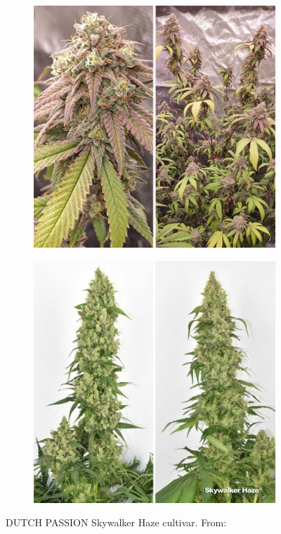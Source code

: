 \begin{figure}[htbp]
    \begin{subfigure}[t]{.48\textwidth}
        \includegraphics[width=\linewidth]{DUTCH-PASSION_Skywalker-Haze_1}
        \label{fig:cannabis_skywalker-haze_1}
    \end{subfigure}
    \begin{subfigure}[t]{.48\textwidth}
        \includegraphics[width=\linewidth]{DUTCH-PASSION_Skywalker-Haze_2}
        \label{fig:cannabis_skywalker-haze_2}
    \end{subfigure}
    \caption[DUTCH PASSION Skywalker Haze]{DUTCH PASSION Skywalker Haze cultivar. From: }
    \label{fig:cannabis_skywalker-haze}
\end{figure}

